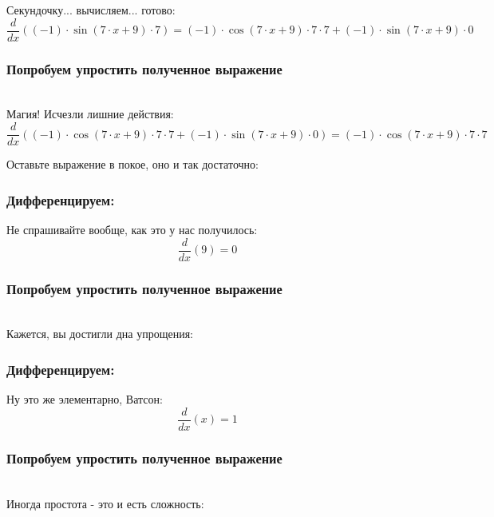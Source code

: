 \documentclass[a4paper,12pt]{article}
\begin{document}
Секундочку... вычисляем... готово:
\begin{dmath}\frac{d}{dx}\left((-1)\cdot \operatorname{sin}\left(7\cdot x+ 9\right) \cdot 7\right)=(-1)\cdot \operatorname{cos}\left(7\cdot x+ 9\right) \cdot 7\cdot 7+ (-1)\cdot \operatorname{sin}\left(7\cdot x+ 9\right) \cdot 0\end{dmath}
\subsubsection*{Попробуем упростить полученное выражение}
\\Магия! Исчезли лишние действия:\\
\begin{dmath}
	\frac{d}{dx}\left((-1)\cdot \operatorname{cos}\left(7\cdot x+ 9\right) \cdot 7\cdot 7+ (-1)\cdot \operatorname{sin}\left(7\cdot x+ 9\right) \cdot 0\right) = (-1)\cdot \operatorname{cos}\left(7\cdot x+ 9\right) \cdot 7\cdot 7\end{dmath}

Оставьте выражение в покое, оно и так достаточно:

\subsubsection*{Дифференцируем:}

Не спрашивайте вообще, как это у нас получилось:
\begin{dmath}\frac{d}{dx}\left(9\right)=0\end{dmath}
\subsubsection*{Попробуем упростить полученное выражение}
\\Кажется, вы достигли дна упрощения:

\subsubsection*{Дифференцируем:}

Ну это же элементарно, Ватсон:
\begin{dmath}\frac{d}{dx}\left(x\right)=1\end{dmath}
\subsubsection*{Попробуем упростить полученное выражение}
\\Иногда простота - это и есть сложность:
\end{document}

